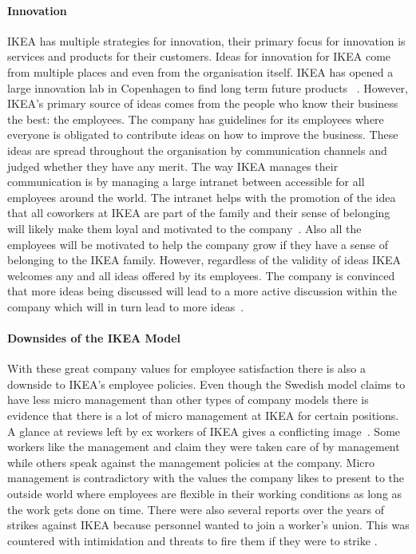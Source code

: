 \paragraph{Innovation} 
IKEA has multiple strategies for innovation, their primary focus for innovation is services and products for their customers. Ideas for innovation for IKEA come from multiple places and even from the organisation itself. IKEA has opened a large innovation lab in Copenhagen to find long term future products ~\citep{fastcodesign2015}. However, IKEA's primary source of ideas comes from the people who know their business the best: the employees. The company has guidelines for its employees where everyone is obligated to contribute ideas on how to improve the business. These ideas are spread throughout the organisation by communication channels and judged whether they have any merit. The way IKEA manages their communication is by managing a large intranet between accessible for all employees around the world. The intranet helps with the promotion of the idea that all coworkers at IKEA are part of the family and their sense of belonging will likely make them loyal and motivated to the company~\citep{bright2015}. Also all the employees will be motivated to help the company grow if they have a sense of belonging to the IKEA family. However, regardless of the validity of ideas IKEA welcomes any and all ideas offered by its employees. The company is convinced that more ideas being discussed will lead to a more active discussion within the company which will in turn lead to more ideas~\citep{fawkes2009}. %


\paragraph{Downsides of the IKEA Model}
With these great company values for employee satisfaction there is also a downside to IKEA's employee policies. Even though the Swedish model claims to have less micro management than other types of company models there is evidence that there is a lot of micro management at IKEA for certain positions. A glance at reviews left by ex workers of IKEA gives a conflicting image~\citep{indeed2016}. Some workers like the management and claim they were taken care of by management while others speak against the management policies at the company. Micro management is contradictory with the values the company likes to present to the outside world where employees are flexible in their working conditions as long as the work gets done on time. There were also several reports over the years of strikes against IKEA because personnel wanted to join a worker's union. This was countered with intimidation and threats to fire them if they were to strike \citep{labornotes2015}\citep{enterprisenews2015}. 

